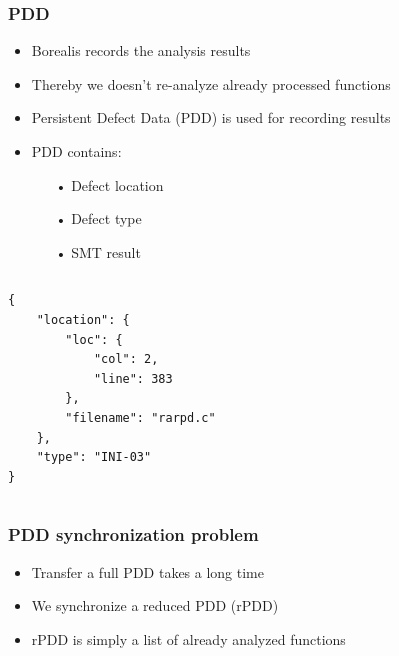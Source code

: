 \begin{frame}[fragile]
\frametitle{PDD}
\begin{itemize}
\item Borealis records the analysis results  
\item Thereby we doesn't re-analyze already processed functions
\item Persistent Defect Data (PDD) is used for recording results
\item PDD contains:
	\begin{itemize}
		\item[•] Defect location
		\item[•] Defect type
		\item[•] SMT result
	\end{itemize}
\end{itemize}
\begin{columns} 
\begin{lstlisting}[style=crs_cpp] 
{
    "location": {
        "loc": {
            "col": 2,
            "line": 383
        },
        "filename": "rarpd.c"
    },
    "type": "INI-03"
}
\end{lstlisting} 
\end{columns}
\end{frame}


\begin{frame}[fragile]
\frametitle{PDD synchronization problem}
\begin{itemize}
\item Transfer a full PDD takes a long time
\item We synchronize a reduced PDD (rPDD)
\item rPDD is simply a list of already analyzed functions
\end{itemize}
\end{frame}


